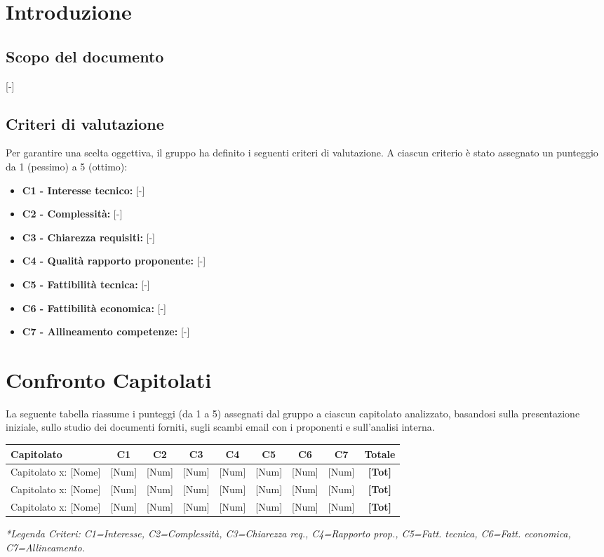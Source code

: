 \section{Introduzione}

\subsection{Scopo del documento}
[-]

\subsection{Criteri di valutazione}
Per garantire una scelta oggettiva, il gruppo ha definito i seguenti criteri di valutazione. A ciascun criterio è stato assegnato un punteggio da 1 (pessimo) a 5 (ottimo):
\begin{itemize}
	\item \textbf{C1 - Interesse tecnico:} {[-]}
	\item \textbf{C2 - Complessità:} {[-]}
	\item \textbf{C3 - Chiarezza requisiti:} {[-]}
	\item \textbf{C4 - Qualità rapporto proponente:} {[-]}
	\item \textbf{C5 - Fattibilità tecnica:} {[-]}
	\item \textbf{C6 - Fattibilità economica:} {[-]}
	\item \textbf{C7 - Allineamento competenze:} {[-]}
\end{itemize}

\newpage
\section{Confronto Capitolati}
La seguente tabella riassume i punteggi (da 1 a 5) assegnati dal gruppo a ciascun capitolato analizzato, basandosi sulla presentazione iniziale, sullo studio dei documenti forniti, sugli scambi email con i proponenti e sull'analisi interna.

\vspace{0.5cm}
\begin{table}[ht]
	\centering
	\renewcommand{\arraystretch}{1.3}
	\begin{tabularx}{\textwidth}{X c c c c c c c | c}
		\toprule
		\textbf{Capitolato} & \textbf{C1} & \textbf{C2} & \textbf{C3} & \textbf{C4} & \textbf{C5} & \textbf{C6} & \textbf{C7} & \textbf{Totale} \\
		\midrule
		Capitolato x: {[Nome]} & [Num] & [Num] & [Num] & [Num] & [Num] & [Num] & [Num] & \textbf{[Tot]} \\
		Capitolato x: {[Nome]} & [Num] & [Num] & [Num] & [Num] & [Num] & [Num] & [Num] & \textbf{[Tot]} \\
		Capitolato x: {[Nome]} & [Num] & [Num] & [Num] & [Num] & [Num] & [Num] & [Num] & \textbf{[Tot]} \\
		\bottomrule
	\end{tabularx}
\end{table}
\vspace{0.2cm}
\textit{*Legenda Criteri: C1=Interesse, C2=Complessità, C3=Chiarezza req., C4=Rapporto prop., C5=Fatt. tecnica, C6=Fatt. economica, C7=Allineamento.}

\vspace{1cm}